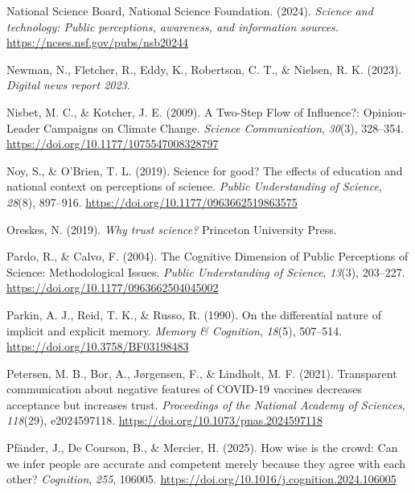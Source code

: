 \documentclass[
  man,
  floatsintext,
  longtable,
  nolmodern,
  notxfonts,
  notimes,
  colorlinks=true,linkcolor=blue,citecolor=blue,urlcolor=blue]{apa7}
\newlength{\cslhangindent}
\newenvironment{CSLReferences}[2] %
 {\begin{list}{}{%
  \setlength{\itemindent}{0pt}
  \setlength{\leftmargin}{0pt}
  \setlength{\parsep}{0pt}
  \ifodd #1
   \setlength{\leftmargin}{\cslhangindent}
   \setlength{\itemindent}{-1\cslhangindent}
  \fi
  \setlength{\itemsep}{#2\baselineskip}}}
 {\end{list}}
\begin{document}
\begin{CSLReferences}{1}{0}
National Science Board, National Science Foundation. (2024).
\emph{Science and technology: Public perceptions, awareness, and
information sources.} \url{https://ncses.nsf.gov/pubs/nsb20244}

Newman, N., Fletcher, R., Eddy, K., Robertson, C. T., \& Nielsen, R. K.
(2023). \emph{Digital news report 2023}.

Nisbet, M. C., \& Kotcher, J. E. (2009). A Two-Step Flow of Influence?:
Opinion-Leader Campaigns on Climate Change. \emph{Science
Communication}, \emph{30}(3), 328--354.
\url{https://doi.org/10.1177/1075547008328797}

Noy, S., \& O'Brien, T. L. (2019). Science for good? The effects of
education and national context on perceptions of science. \emph{Public
Understanding of Science}, \emph{28}(8), 897--916.
\url{https://doi.org/10.1177/0963662519863575}

Oreskes, N. (2019). \emph{Why trust science?} Princeton University
Press.

Pardo, R., \& Calvo, F. (2004). The Cognitive Dimension of Public
Perceptions of Science: Methodological Issues. \emph{Public
Understanding of Science}, \emph{13}(3), 203--227.
\url{https://doi.org/10.1177/0963662504045002}

Parkin, A. J., Reid, T. K., \& Russo, R. (1990). On the differential
nature of implicit and explicit memory. \emph{Memory \& Cognition},
\emph{18}(5), 507--514. \url{https://doi.org/10.3758/BF03198483}

Petersen, M. B., Bor, A., Jørgensen, F., \& Lindholt, M. F. (2021).
Transparent communication about negative features of COVID-19 vaccines
decreases acceptance but increases trust. \emph{Proceedings of the
National Academy of Sciences}, \emph{118}(29), e2024597118.
\url{https://doi.org/10.1073/pnas.2024597118}

Pfänder, J., De Courson, B., \& Mercier, H. (2025). How wise is the
crowd: Can we infer people are accurate and competent merely because
they agree with each other? \emph{Cognition}, \emph{255}, 106005.
\url{https://doi.org/10.1016/j.cognition.2024.106005}


\end{CSLReferences}
\end{document}
